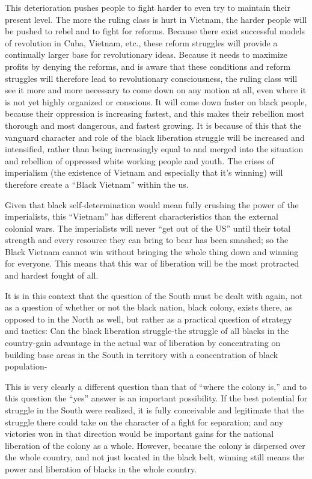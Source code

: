 \documentclass[12pt, titlepage]{article}
\begin{document}
{\begin{spacing}{1.10}
This deterioration pushes people to fight harder to even try to maintain their present level. The more the ruling class is hurt in Vietnam, the harder people will be pushed to rebel and to fight for reforms. Because there exist successful models of revolution in Cuba, Vietnam, etc., these reform struggles will provide a continually larger base for revolutionary ideas. Because it needs to maximize profits by denying the reforms, and is aware that these conditions and reform struggles will therefore lead to revolutionary consciousness, the ruling class will see it more and more necessary to come down on any motion at all, even where it is not yet highly organized or conscious. It will come down faster on black people, because their oppression is increasing fastest, and this makes their rebellion most thorough and most dangerous, and fastest growing. It is because of this that the vanguard character and role of the black liberation struggle will be increased and intensified, rather than being increasingly equal to and merged into the situation and rebellion of oppressed white working people and youth. The crises of imperialism (the existence of Vietnam and especially that it's winning) will therefore create a ``Black Vietnam'' within the us.

Given that black self-determination would mean fully crushing the power of the imperialists, this ``Vietnam'' has different characteristics than the external colonial wars. The imperialists will never ``get out of the US'' until their total strength and every resource they can bring to bear has been smashed; so the Black Vietnam cannot win without bringing the whole thing down and winning for everyone. This means that this war of liberation will be the most protracted and hardest fought of all.

It is in this context that the question of the South must be dealt with again, not as a question of whether or not the black nation, black colony, exists there, as opposed to in the North as well, but rather as a practical question of strategy and tactics: Can the black liberation struggle-the struggle of all blacks in the country-gain advantage in the actual war of liberation by concentrating on building base areas in the South in territory with a concentration of black population-

This is very clearly a different question than that of ``where the colony is,'' and to this question the ``yes'' answer is an important possibility. If the best potential for struggle in the South were realized, it is fully conceivable and legitimate that the struggle there could take on the character of a fight for separation; and any victories won in that direction would be important gains for the national liberation of the colony as a whole. However, because the colony is dispersed over the whole country, and not just located in the black belt, winning still means the power and liberation of blacks in the whole country.


\end{spacing}}
\end{document}
